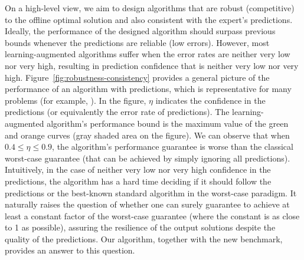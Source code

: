 On a high-level view, we aim to design algorithms that are robust (competitive) to the offline optimal solution and also consistent with the expert's predictions. Ideally, the performance of the designed algorithm should surpass previous bounds whenever the predictions are reliable (low errors).
However, most learning-augmented algorithms suffer when the error rates are neither very low nor very high, resulting in prediction confidence that is neither very low nor very high.
Figure~\ref{fig:robustness-consistency} provides a general picture of the performance of an algorithm with predictions, which is representative for many problems (for example, \cite{BamasMaggoriSvensson20:primal-dual-method,KeviNguyen23:Primal-Dual-Algorithms}). In the figure, $\eta$ indicates the confidence in the predictions (or equivalently the error rate of predictions). The learning-augmented algorithm's performance bound is the maximum value of the green and orange curves (gray shaded area on the figure). We can observe that when $0.4 \leq \eta \leq 0.9$,
the algorithm's performance guarantee is worse than the classical worst-case guarantee (that can be achieved by simply ignoring all predictions).
Intuitively, in the case of neither very low nor very high confidence in the predictions, the algorithm has a hard time deciding if it should follow the predictions or the best-known standard algorithm in the worst-case paradigm.
It naturally raises the question of whether one can surely guarantee to achieve at least a constant factor of the worst-case guarantee (where the constant is as close to 1 as possible), assuring the resilience of the output solutions despite the quality of the predictions.
Our algorithm, together with the new benchmark, provides an answer to this question.


